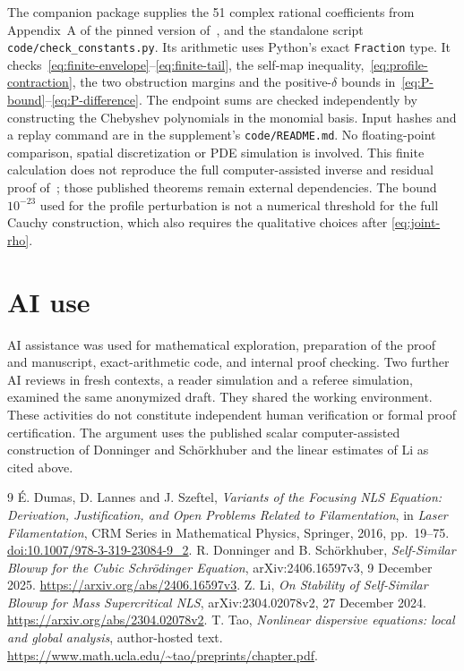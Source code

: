 \documentclass[11pt]{article}
\numberwithin{equation}{section}
\theoremstyle{remark}
\begin{document}
The companion package supplies the 51 complex rational coefficients from
Appendix~A of the pinned version of~\cite{DS}, and the standalone script
\texttt{code/check\_constants.py}. Its arithmetic uses Python's exact
\texttt{Fraction} type. It checks~\eqref{eq:finite-envelope}--\eqref{eq:finite-tail},
the self-map inequality,~\eqref{eq:profile-contraction}, the two obstruction
margins and the positive-$\delta$ bounds in~\eqref{eq:P-bound}--\eqref{eq:P-difference}.
The endpoint sums are checked independently by constructing the
Chebyshev polynomials in the monomial basis. Input hashes and a replay
command are in the supplement's \texttt{code/README.md}. No floating-point comparison,
spatial discretization or PDE simulation is involved.
This finite calculation does not reproduce the full computer-assisted
inverse and residual proof of~\cite{DS}; those published theorems remain
external dependencies. The bound $10^{-23}$ used for the profile
perturbation is not a numerical threshold for the full Cauchy
construction, which also requires the qualitative choices after
\eqref{eq:joint-rho}.

\section*{AI use}
AI assistance was used for mathematical exploration, preparation of the
proof and manuscript, exact-arithmetic code, and internal proof checking.
Two further AI reviews in fresh contexts, a reader simulation and a
referee simulation, examined the same anonymized draft. They shared the
working environment. These activities do not constitute independent
human verification or formal proof certification. The argument uses the published scalar
computer-assisted construction of Donninger and Sch\"orkhuber and the
linear estimates of Li as cited above.

\begin{thebibliography}{9}
\'E. Dumas, D. Lannes and J. Szeftel,
\emph{Variants of the Focusing NLS Equation: Derivation, Justification,
and Open Problems Related to Filamentation},
in \emph{Laser Filamentation}, CRM Series in Mathematical Physics,
Springer, 2016, pp.~19--75.
\href{https://doi.org/10.1007/978-3-319-23084-9_2}{doi:10.1007/978-3-319-23084-9\_2}.
R. Donninger and B. Sch\"orkhuber,
\emph{Self-Similar Blowup for the Cubic Schr\"odinger Equation},
arXiv:2406.16597v3, 9 December 2025.
\url{https://arxiv.org/abs/2406.16597v3}.
Z. Li,
\emph{On Stability of Self-Similar Blowup for Mass Supercritical NLS},
arXiv:2304.02078v2, 27 December 2024.
\url{https://arxiv.org/abs/2304.02078v2}.
T. Tao,
\emph{Nonlinear dispersive equations: local and global analysis},
author-hosted text.
\url{https://www.math.ucla.edu/~tao/preprints/chapter.pdf}.
\end{thebibliography}
\end{document}
